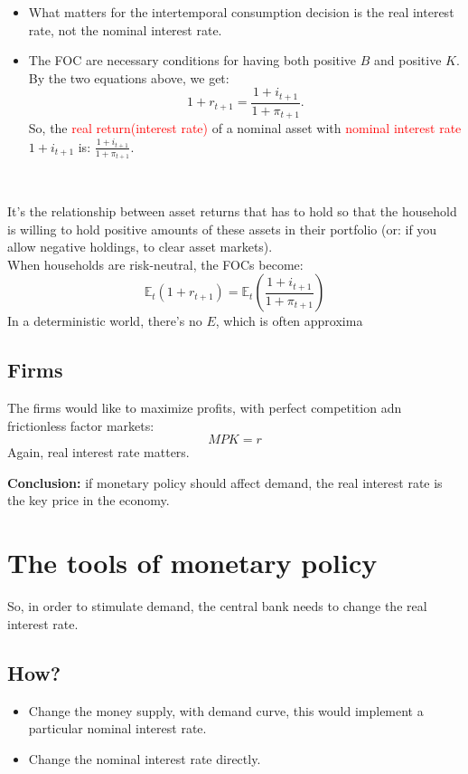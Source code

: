 \begin{itemize}
    \item What matters for the intertemporal consumption decision is
    the real interest rate, not the nominal interest rate.
    \item The FOC are necessary conditions for having both positive $B$
    and positive $K$. By the two equations above, we get:
    \[1+r_{t+1} = \frac{1+i_{t+1}}{1+\pi_{t+1}}. \]
    So, the \textcolor{red}{real return(interest rate)} of a nominal asset
    with \textcolor{red}{nominal interest rate} $1+i_{t+1} $ is: $\frac{1+i_{t+1} }{1+\pi_{t+1}}$.
\end{itemize}

\begin{corollary}
    \ 

    It's the relationship between asset returns that has to hold 
    so that the household is willing to hold positive amounts 
    of these assets in their portfolio (or: if you allow negative 
    holdings, to clear asset markets). \\
    When households are risk-neutral, the FOCs become:
    \[\mathbb{E}_t (1+r_{t+1}) = \mathbb{E}_t \left(\frac{1+i_{t+1}}{1+\pi_{t+1}}\right) \]
    In a deterministic world, there's no $E$, which is often approxima
\end{corollary}

\subsection{Firms}
The firms would like to maximize profits, with perfect competition adn frictionless factor markets:
\[MPK = r\]
Again, real interest rate matters. 

\textbf{Conclusion:} if monetary policy should affect demand, the real interest rate is the key price in the economy.

\section{The tools of monetary policy}
So, in order to stimulate demand, the central bank needs to change the real interest rate.

\subsection*{How?}

\begin{itemize}
    \item Change the money supply, with demand curve, this would implement a particular nominal interest rate.
    \item Change the nominal interest rate directly.
\end{itemize}

